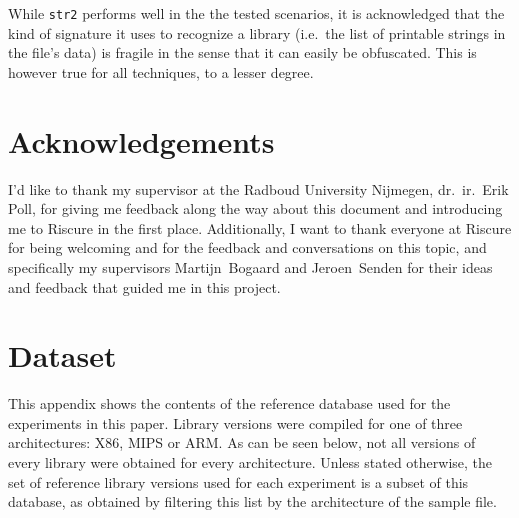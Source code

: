 \documentclass[twocolumn,a4paper]{IEEEtran} %
\begin{document}
While \texttt{str2} performs well in the the tested scenarios, it is acknowledged that the kind of signature it uses to recognize a library (i.e.~the list of printable strings in the file's data) is fragile in the sense that it can easily be obfuscated. This is however true for all techniques, to a lesser degree.

\newpage
\section{Acknowledgements}
I'd like to thank my supervisor at the Radboud University Nijmegen, dr.~ir.~Erik Poll, for giving me feedback along the way about this document and introducing me to Riscure in the first place. Additionally, I want to thank everyone at Riscure for being welcoming and for the feedback and conversations on this topic, and specifically my supervisors Martijn~Bogaard and Jeroen~Senden for their ideas and feedback that guided me in this project.

\newpage
\medskip


\newpage
\appendix
\section{Dataset}
This appendix shows the contents of the reference database used for the experiments in this paper. Library versions were compiled for one of three architectures: X86, MIPS or ARM. As can be seen below, not all versions of every library were obtained for every architecture. Unless stated otherwise, the set of reference library versions used for each experiment is a subset of this database, as obtained by filtering this list by the architecture of the sample file.

~\\
\end{document}
